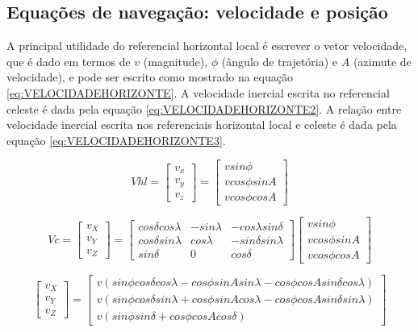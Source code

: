 \subsection{Equações de navegação: velocidade e posição}

A principal utilidade do referencial horizontal local é escrever o vetor velocidade, que é dado em termos de $v$ (magnitude), $\phi$ (ângulo de trajetória) e $A$ (azimute de velocidade), e pode ser escrito como mostrado na equação \ref{eq:VELOCIDADEHORIZONTE}. A velocidade inercial escrita no referencial celeste é dada pela equação \ref{eq:VELOCIDADEHORIZONTE2}. A relação entre velocidade inercial escrita nos referenciais horizontal local e celeste é dada pela equação \ref{eq:VELOCIDADEHORIZONTE3}.

\begin{equation}
Vhl =  
\left[\begin{array}{l}
v_{x} \\
v_{y}  \\
v_{z} 
\end{array}\right] = 
\left[\begin{array}{l}
v sin\phi\\
v cos\phi sin A \\
v cos\phi cos A
\end{array}\right]
\label{eq:VELOCIDADEHORIZONTE}
\end{equation}

\begin{equation}
Vc =
\left[\begin{array}{l}
v_{X} \\
v_{Y}  \\
v_{Z} 
\end{array}\right] = 
\left[\begin{array}{lll}
cos \delta cos\lambda & -sin\lambda & -cos\lambda sin\delta \\
cos \delta sin\lambda & cos\lambda & -sin\delta sin\lambda \\
sin \delta & 0 & cos\delta
\end{array}\right]
\left[\begin{array}{l}
v sin\phi\\
v cos\phi sin A \\
v cos\phi cos A
\end{array}\right]
\label{eq:VELOCIDADEHORIZONTE2}
\end{equation}

\begin{equation}
\left[\begin{array}{l}
v_{X} \\
v_{Y}  \\
v_{Z} 
\end{array}\right] = 
\left[\begin{array}{l}
v (sin\phi cos\delta cos\lambda - cos\phi sin A sin\lambda - cos\phi cos A sin \delta cos\lambda)\\
v (sin\phi cos\delta sin\lambda + cos\phi sin A cos\lambda - cos\phi cos A sin \delta sin\lambda)\\
v (sin\phi sin \delta + cos\phi cos A cos \delta)
\end{array}\right]
\label{eq:VELOCIDADEHORIZONTE3}
\end{equation}


